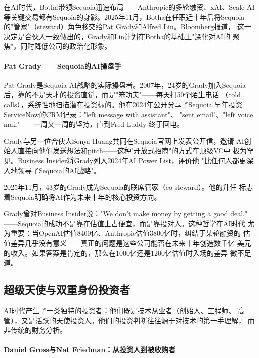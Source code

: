 在AI时代，Botha带领Sequoia迅速布局——Anthropic的多轮融资、xAI、Scale AI
等关键交易都有Sequoia的身影。2025年11月，Botha在任职近十年后将Sequoia
的"管家"（steward）角色移交给Pat Grady和Alfred Lin。Bloomberg报道，
这一决定是合伙人一致做出的，Grady和Lin计划在Botha的基础上"深化对AI的
聚焦"，同时降低公司的政治化形象。

\paragraph{Pat Grady——Sequoia的AI操盘手}

Pat Grady是Sequoia AI战略的实际操盘者。2007年，24岁的Grady加入Sequoia
后，靠的不是天才的投资直觉，而是"笨功夫"——每天打50个陌生电话
（cold calls），系统性地扫描潜在投资标的。他在2024年公开分享了Sequoia
早年投资ServiceNow的CRM记录："left message with assistant"、
"sent email"、"left voice mail"——一周又一周的坚持，直到Fred Luddy
终于回电。

Grady与另一位合伙人Sonya Huang共同在Sequoia官网上发表公开信，邀请
AI创始人直接向他们发送想法和pitch——这种"开放式招商"的方式在顶级VC中
极为罕见。Business Insider将Grady列入2024年AI Power List，评价他
"比任何人都更深入地领导了Sequoia的AI战略"。

2025年11月，43岁的Grady成为Sequoia的联席管家（co-steward）。他的升任
标志着Sequoia明确将AI作为未来十年的核心投资方向。

\begin{whybox}
Grady曾对Business Insider说："We don't make money by getting a good deal."
——Sequoia的成功不是靠在估值上占便宜，而是靠投对人。这种哲学在AI时代
尤为重要：当OpenAI估值8400亿、Anthropic估值3800亿时，纠结于某轮融资的
估值差异几乎没有意义——真正的问题是这些公司能否在未来十年创造数千亿
美元的收入。如果答案是肯定的，那么在1000亿还是1200亿估值时入场的差异
微不足道。
\end{whybox}


\subsection{超级天使与双重身份投资者}
\label{subsec:inv-angels}

AI时代产生了一类独特的投资者：他们既是技术从业者（创始人、工程师、
高管），又是活跃的天使投资人。他们的投资判断往往源于对技术的第一手理解，
而非传统的财务分析。

\paragraph{Daniel Gross与Nat Friedman：从投资人到被收购者}

